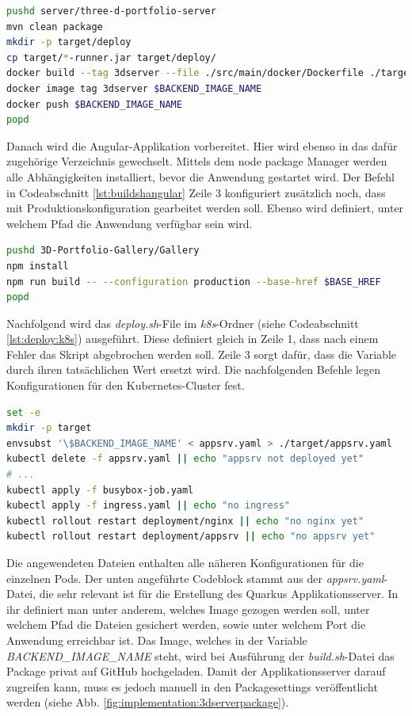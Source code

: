 \begin{lstlisting}[label=lst:buildshquarkus, language=bash, caption=Quarkus-Teil in der build.sh-Datei]
pushd server/three-d-portfolio-server
mvn clean package
mkdir -p target/deploy
cp target/*-runner.jar target/deploy/
docker build --tag 3dserver --file ./src/main/docker/Dockerfile ./target/deploy
docker image tag 3dserver $BACKEND_IMAGE_NAME
docker push $BACKEND_IMAGE_NAME
popd
\end{lstlisting}

Danach wird die Angular-Applikation vorbereitet. 
Hier wird ebenso in das dafür zugehörige Verzeichnis gewechselt.
Mittels dem node package Manager werden alle Abhängigkeiten installiert, bevor die Anwendung gestartet wird. 
Der Befehl in Codeabschnitt \ref{lst:buildshangular} Zeile 3 konfiguriert zusätzlich noch, dass mit Produktionskonfiguration gearbeitet werden soll. 
Ebenso wird definiert, unter welchem Pfad die Anwendung verfügbar sein wird.

\begin{lstlisting}[label=lst:buildshangular, language=bash, caption=Frontend-relevanter Teil der build.sh-Datei]
pushd 3D-Portfolio-Gallery/Gallery
npm install
npm run build -- --configuration production --base-href $BASE_HREF
popd
\end{lstlisting}

Nachfolgend wird das \emph{deploy.sh}-File im \emph{k8s}-Ordner (siehe Codeabschnitt \ref{lst:deploy:k8s}) ausgeführt. 
Diese definiert gleich in Zeile 1, dass nach einem Fehler das Skript abgebrochen werden soll. 
Zeile 3 sorgt dafür, dass die Variable durch ihren tatsächlichen Wert ersetzt wird. 
Die nachfolgenden Befehle legen Konfigurationen für den Kubernetes-Cluster fest.

\begin{lstlisting}[label=lst:deploy:k8s, language=bash, caption=k8s deploy.sh-Datei]
set -e
mkdir -p target
envsubst '\$BACKEND_IMAGE_NAME' < appsrv.yaml > ./target/appsrv.yaml
kubectl delete -f appsrv.yaml || echo "appsrv not deployed yet"
# ...
kubectl apply -f busybox-job.yaml
kubectl apply -f ingress.yaml || echo "no ingress"
kubectl rollout restart deployment/nginx || echo "no nginx yet"
kubectl rollout restart deployment/appsrv || echo "no appsrv yet"
\end{lstlisting}

Die angewendeten Dateien enthalten alle näheren Konfigurationen für die einzelnen Pods. 
Der unten angeführte Codeblock stammt aus der \emph{appsrv.yaml}-Datei, die sehr relevant ist für die Erstellung des Quarkus Applikationsserver. 
In ihr definiert man unter anderem, welches Image gezogen werden soll, unter welchem Pfad die Dateien gesichert werden, sowie unter welchem Port die Anwendung erreichbar ist.
Das Image, welches in der Variable \emph{BACKEND\_IMAGE\_NAME} steht, wird bei Ausführung der \emph{build.sh}-Datei das Package privat auf GitHub hochgeladen.
Damit der Applikationsserver darauf zugreifen kann, muss es jedoch manuell in den Packagesettings veröffentlicht werden (siehe Abb. \ref{fig:implementation:3dserverpackage}).

